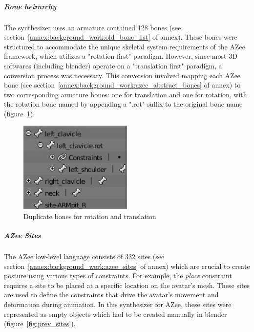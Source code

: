 \documentclass[../../main.tex]{subfiles}
\begin{document}
\subparagraph{Bone heirarchy}
\label{ch:background_work:sign_language_synthesis:3d_techniques:sign_language_synthesis_systems:azee_based:low_level_synthesizer_for_azee:bone_heirarchy}

The synthesizer uses an armature contained 128 bones (see section~\ref{annex:background_work:old_bone_list} of annex). These bones were structured to accommodate the unique skeletal system requirements of the AZee framework, which utilizes a "rotation first" paradigm. However, since most 3D softwares (including blender) operate on a "translation first" paradigm, a conversion process was necessary. This conversion involved mapping each AZee bone (see section~\ref{annex:background_work:azee_abstract_bones} of annex) to two corresponding armature bones: one for translation and one for rotation, with the rotation bone named by appending a ".rot" suffix to the original bone name (figure~\ref{fig:old_bone_structure}).

\begin{figure}
    \centering
    \includegraphics[width=0.5\textwidth]{chapters/avatar_creation_pose_synthesis/images/old_bone_structure.png}
    \caption{Duplicate bones for rotation and translation}
    \label{fig:old_bone_structure}
\end{figure}

\subparagraph{AZee Sites}
\label{ch:background_work:sign_language_synthesis:3d_techniques:sign_language_synthesis_systems:azee_based:low_level_synthesizer_for_azee:azee_sites}

The AZee low-level language consists of 332 sites (see section~\ref{annex:background_work:azee_sites} of annex) which are crucial to create posture using various types of constraints. For example, the \emph{place} constraint requires a site to be placed at a specific location on the avatar's mesh. These sites are used to define the constraints that drive the avatar's movement and deformation during animation. In this synthesizer for AZee, these sites were represented as empty objects which had to be created manually in blender (figure~\ref{fig:prev_sites}).
\end{document}
